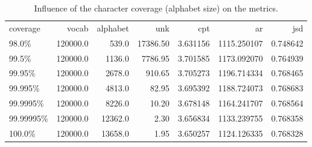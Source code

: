 \begin{table}
\centering
\caption{Influence of the character coverage (alphabet size) on the metrics.}
\label{tab:coverage_influence}
\begin{tabular}{lrrrrrr}
\toprule
 coverage &    vocab &  alphabet &      unk &      cpt &          ar &      jsd \\
    98.0\% & 120000.0 &     539.0 & 17386.50 & 3.631156 & 1115.250107 & 0.748642 \\
\midrule
    99.5\% & 120000.0 &    1136.0 &  7786.95 & 3.701585 & 1173.092070 & 0.764939 \\
   99.95\% & 120000.0 &    2678.0 &   910.65 & 3.705273 & 1196.714334 & 0.768465 \\
  99.995\% & 120000.0 &    4813.0 &    82.95 & 3.695392 & 1188.724073 & 0.768683 \\
 99.9995\% & 120000.0 &    8226.0 &    10.20 & 3.678148 & 1164.241707 & 0.768564 \\
99.99995\% & 120000.0 &   12362.0 &     2.30 & 3.656834 & 1133.239755 & 0.768358 \\
   100.0\% & 120000.0 &   13658.0 &     1.95 & 3.650257 & 1124.126335 & 0.768328 \\
\bottomrule
\end{tabular}
\end{table}
